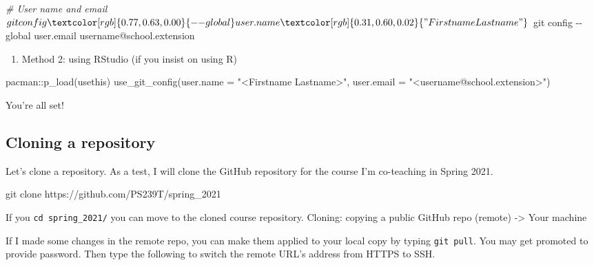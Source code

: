 \documentclass[
]{book}
\newenvironment{Shaded}{\begin{snugshade}}{\end{snugshade}}
\newcommand{\AttributeTok}[1]{\textcolor[rgb]{0.77,0.63,0.00}{#1}}
\newcommand{\CommentTok}[1]{\textcolor[rgb]{0.56,0.35,0.01}{\textit{#1}}}
\newcommand{\ExtensionTok}[1]{#1}
\newcommand{\FunctionTok}[1]{\textcolor[rgb]{0.00,0.00,0.00}{#1}}
\newcommand{\NormalTok}[1]{#1}
\newcommand{\SpecialCharTok}[1]{\textcolor[rgb]{0.00,0.00,0.00}{#1}}
\newcommand{\StringTok}[1]{\textcolor[rgb]{0.31,0.60,0.02}{#1}}
\providecommand{\tightlist}{%
  \setlength{\itemsep}{0pt}\setlength{\parskip}{0pt}}
\begin{document}
\begin{Shaded}
\begin{Highlighting}[]

\CommentTok{\# User name and email }
\ExtensionTok{$}\NormalTok{ git config }\AttributeTok{{-}{-}global}\NormalTok{ user.name }\StringTok{"Firstname Lastname"}
\ExtensionTok{$}\NormalTok{ git config }\AttributeTok{{-}{-}global}\NormalTok{ user.email username@school.extension}
\end{Highlighting}
\end{Shaded}

\begin{enumerate}
\def\labelenumi{\arabic{enumi}.}
\setcounter{enumi}{1}
\tightlist
\item
  Method 2: using RStudio (if you insist on using R)
\end{enumerate}

\begin{Shaded}
\begin{Highlighting}[]
\NormalTok{pacman}\SpecialCharTok{::}\FunctionTok{p\_load}\NormalTok{(usethis)}
\FunctionTok{use\_git\_config}\NormalTok{(}\AttributeTok{user.name =} \StringTok{"\textless{}Firstname Lastname\textgreater{}"}\NormalTok{,}
               \AttributeTok{user.email =} \StringTok{"\textless{}username@school.extension\textgreater{}"}\NormalTok{)}
\end{Highlighting}
\end{Shaded}

You're all set!

\hypertarget{cloning-a-repository}{%
\subsection{Cloning a repository}\label{cloning-a-repository}}

Let's clone a repository. As a test, I will clone the GitHub repository for the course I'm co-teaching in Spring 2021.

\begin{Shaded}
\begin{Highlighting}[]
\FunctionTok{git}\NormalTok{ clone https://github.com/PS239T/spring\_2021}
\end{Highlighting}
\end{Shaded}

If you \texttt{cd\ spring\_2021/} you can move to the cloned course repository. Cloning: copying a public GitHub repo (remote) -\textgreater{} Your machine

If I made some changes in the remote repo, you can make them applied to your local copy by typing \texttt{git\ pull}. You may get promoted to provide password. Then type the following to switch the remote URL's address from HTTPS to SSH.
\end{document}
